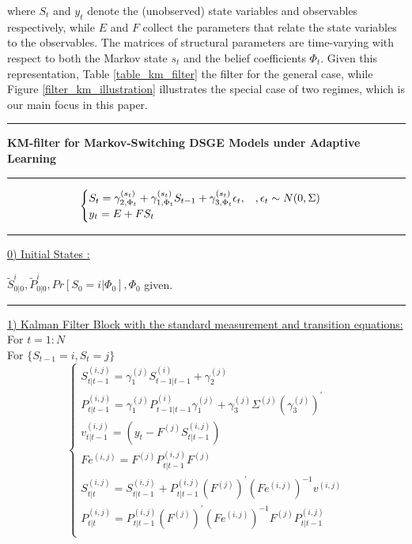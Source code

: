 \documentclass[12pt,reqno]{article}
\numberwithin{equation}{section}
\begin{document}
where $S_t$ and $y_t$ denote the (unobserved) state variables and observables respectively, while $E$ and $F$ collect the parameters that relate the state variables to the observables. The matrices of structural parameters are time-varying with respect to both the Markov state $s_t$ and the belief coefficients $\Phi_t$. Given this representation, Table \ref{table_km_filter} the filter for the general case, while Figure \ref{filter_km_illustration} illustrates the special case of two regimes, which is our main focus in this paper. \\


\begin{table}[H]

\noindent\rule{\textwidth}{1pt}
\caption{\textbf{KM-filter for Markov-Switching DSGE Models under Adaptive Learning}}
\label{table_km_filter}
\noindent\rule{\textwidth}{1pt}
$$
\begin{cases}
S_t = \gamma_{2,\Phi_t}^{(s_t)} + \gamma_{1,\Phi_t}^{(s_t)} S_{t-1} + \gamma_{3,\Phi_t}^{(s_t)} \epsilon_t, \hspace{3 mm}, \epsilon_t \sim N(0, \Sigma) \\
y_t = E+ F S_t \\
\end{cases}
$$

\noindent\rule{\textwidth}{1pt}

\underline{0) Initial  States :}

$ \tilde{S}_{0|0}^{i}, \tilde{P}_{0|0}^{i}, Pr[ S_0=i | \Phi_0] , \Phi_0$  given.\\
\noindent\rule{\textwidth}{1pt}

\noindent
\underline{1) Kalman Filter Block with the standard measurement and transition equations:} \\
For $t=1:N$\\
    For $\{S_{t-1}=i, S_t=j\} $
\noindent
$$
\begin{cases}
S_{t|t-1}^{(i,j)}=\gamma_1^{(j)} S_{t-1|t-1}^{(i)} + \gamma_2^{(j)} \\
P_{t|t-1}^{(i,j)}=\gamma_1^{(j)} P_{t-1|t-1}^{(i)} \gamma_1^{(j)} + \gamma_3^{(j)} \Sigma^{(j)} (\gamma_3^{(j)})^{\prime} \\
v^{(i,j)}_{t|t-1} = (y_t - F^{(j)} S_{t|t-1}^{(i,j)})\\
Fe^{(i,j)}=F^{(j)} P_{t|t-1}^{(i,j)}F^{(j)} \\
S_{t|t}^{(i,j)}= S_{t|t-1}^{(i,j)} + P_{t|t-1}^{(i,j)} (F^{(j)})^{\prime} {(Fe^{(i,j)})}^{-1} v^{(i,j)} \\
P_{t|t}^{(i,j)} = P_{t|t-1}^{(i,j)} (F^{(j)})^{\prime} (Fe^{(i,j)})^{-1} F^{(j)} P_{t|t-1}^{(i,j)} \\
\end{cases}
$$


\end{table}
\end{document}
